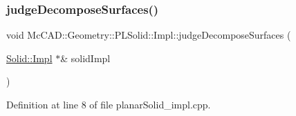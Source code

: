 \subsubsection{\texorpdfstring{judge\+Decompose\+Surfaces()}{judgeDecomposeSurfaces()}\hspace{0.1cm}{\footnotesize\ttfamily [1/2]}}
{\footnotesize\ttfamily void Mc\+C\+A\+D\+::\+Geometry\+::\+P\+L\+Solid\+::\+Impl\+::judge\+Decompose\+Surfaces (\begin{DoxyParamCaption}\item[{\hyperlink{classMcCAD_1_1Geometry_1_1Solid_1_1Impl}{Solid\+::\+Impl} $\ast$\&}]{solid\+Impl }\end{DoxyParamCaption})}



Definition at line 8 of file planar\+Solid\+\_\+impl.\+cpp.



